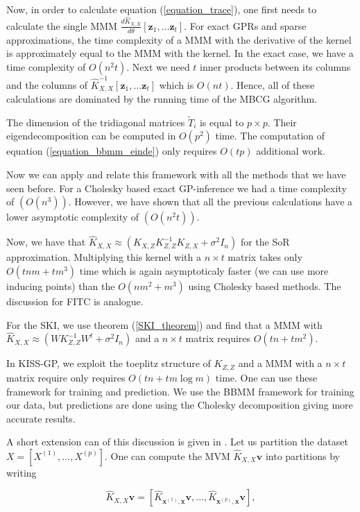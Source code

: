 \documentclass[12pt,a4paper,oneside]{book}
\begin{document}
Now, in order to calculate equation (\ref{equation_trace}), one first needs to calculate the single MMM $\frac{d\hat{K}_{X,X}}{d\theta} [ \bm{z}_1, \ldots \bm{z}_t]$. For exact GPRs and sparse approximations, the time complexity of a MMM with the derivative of the kernel is approximately equal to the MMM with the kernel. In the exact case, we have a time complexity of $O(n^2t)$. Next we need $t$ inner products between its columns and the columns of $\hat{K}^{-1}_{X,X}[ \bm{z}_1, \ldots \bm{z}_t]$ which is $O(nt)$. Hence, all of these calculations are dominated by the running time of the MBCG algorithm. 

The dimension of the tridiagonal matrices $\tilde{T}_i$ is equal to $p \times p$. Their eigendecomposition can be computed in $O(p^2)$ time. The computation of equation (\ref{equation_bbmm_einde}) only requires $O(tp)$ additional work. 

Now we can apply and relate this framework with all the methods that we have seen before. For a Cholesky based exact GP-inference we had a time complexity of $(O(n^3))$. However, we have shown that all the previous calculations have a lower asymptotic complexity of $(O(n^2t))$. 

Now, we have that $ \hat{K}_{X,X} \approx ( K_{X,Z} K_{Z,Z}^{-1} K_{Z,X} + \sigma^2 I_n)$ for the SoR approximation. Multiplying this kernel with a $n \times t$ matrix takes only $O(tnm + tm^3)$ time which is again asymptoticaly faster (we can use more inducing points) than the $O(nm^2 + m^3)$ using Cholesky based methods. The discussion for FITC is analogue. 

For the SKI, we use theorem (\ref{SKI_theorem}) and find that a MMM with $\hat{K}_{X,X} \approx ( W K_{Z,Z}^{-1} W^t + \sigma^2 I_n)$ and a $n \times t$ matrix requires $O(tn + tm^2)$. 

In KISS-GP, we exploit the toeplitz structure of $K_{Z,Z}$ and a MMM with a $n \times t$ matrix require only requires $O(tn + tm \log{m})$ time. One can use these framework for training and prediction. We use the BBMM framework for training our data, but predictions are done using the Cholesky decomposition giving more accurate results.

A short extension can of this discussion is given in \cite{wang2019exact}. Let us partition the dataset $X = [X^{(1)}, \ldots, X^{(p)}]$. One can compute the MVM $ \hat{K}_{X,X} \bm{v}$ into partitions by writing 

\begin{equation}
\hat{K}_{X,X} \bm{v} = [ \hat{K}_{\bm{x}^{(1)},\bm{x}} \bm{v}, \ldots,  \hat{K}_{\bm{x}^{(p)},\bm{x}} \bm{v}],
\end{equation}
\end{document}
